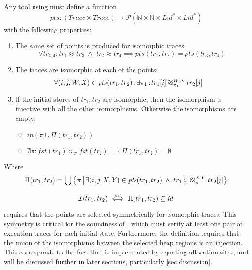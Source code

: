 \documentclass[runningheads,a4paper]{llncs}
\DeclareMathOperator{\band}{\bm{\;\land\;}}
\DeclareMathOperator{\suchthat}{:}
\newcommand*{\qvars}[2]{#1_{#2}}
\newcommand*{\powerset}[1]{\mathcal{P}(#1)}
\newcommand*{\identity}[0]{\mathit{id}}
\newcommand*{\defiff}{\stackrel{\text{\tiny def}}{\iff}}
\newcommand*{\setcomp}[2]{\left\{#1\,\middle|\,#2\right\}}
\newcommand*{\nat}{\mathbb{N}}
\newcommand*{\first}[1]{\mathit{fst}(#1)}
\newcommand*{\Trace}{\mathit{Trace}}
\newcommand{\tr}{tr}
\newcommand*\iso{\approx}
\newcommand*{\LVar}{\mathit{Lid}}
\newcommand*{\bijection}[1]{\mathit{in}{\left(#1\right)}}
\newcommand*{\wiso}{%
  \mathrel{\vcenter{\offinterlineskip
  \hbox{$\sim$}\vskip-.35ex\hbox{$\sim$}\vskip-.35ex\hbox{$\sim$}}}}
\newcommand*{\myIsoCompatibleStates}{\mathit{pts}}
\newcommand*{\isoR}{\mathcal{I}}
\begin{document}
\begin{definition}\label{def:isomorphic points}\setlength{\parindent}{0cm}
	
	Any tool using \metho{} must define a function
	\[\myIsoCompatibleStates : (\Trace\times\Trace) \rightarrow \powerset{\nat \times \nat \times \LVar^* \times \LVar^*}\]
	with the following properties:
	\begin{enumerate}
		\item The same set of points is produced for isomorphic traces:
		\[
			\forall \qvars{\tr}{3,4} \suchthat \tr_1\iso\tr_3 \band \tr_2\iso\tr_4
			\implies \myIsoCompatibleStates(\tr_1,\tr_2) = \myIsoCompatibleStates(\tr_3,\tr_4)
		\]
		\item The traces are isomorphic at each of the points:
		\[\begin{aligned}
			&\forall (i,j,W,X)\in \myIsoCompatibleStates(\tr_1,\tr_2) \suchthat \exists \pi_1 \suchthat \tr_1[i] \wiso_{\pi_1}^{W,X} \tr_2[j]
		\end{aligned}\]
		\item If the initial stores of $\tr_1,\tr_2$ are isomorphic, then the isomorphism is injective with all the other isomorphisms. Otherwise the isomorphisms are empty.
		\begin{itemize}
			\item $\bijection{\pi \cup \Pi(\tr_1,\tr_2)}$
			\item $\nexists \pi \suchthat \first{\tr_1} \iso_{\pi} \first{\tr_2} \implies \Pi(\tr_1,\tr_2) = \emptyset$
		\end{itemize}
	\end{enumerate}
	Where
	\[\begin{aligned}
		\Pi(\tr_1,\tr_2) = \bigcup\setcomp{\pi}{\exists (i,j,X,Y) \in \myIsoCompatibleStates(\tr_1,\tr_2) \band \tr_1[i] \wiso_{\pi}^{X,Y} \tr_2[j]}
	\end{aligned}\]
\end{definition}

\begin{definition}\label{def:my compatible isomorphic states}\setlength{\parindent}{0cm}
\[\isoR(\tr_1,\tr_2) \defiff \Pi(\tr_1,\tr_2) \subseteq \identity\]
\end{definition}

 requires that the points are selected symmetrically for isomorphic traces. This symmetry is critical for the soundness of \metho{}, which must verify at least one pair of execution traces for each initial state. Furthermore, the definition requires that the union of the isomorphisms between the selected heap regions is an injection. This corresponds to the fact that \metho{} is implemented by equating allocation sites, and will be discussed further in later sections, particularly \cref{sec:discussion}.
\end{document}
